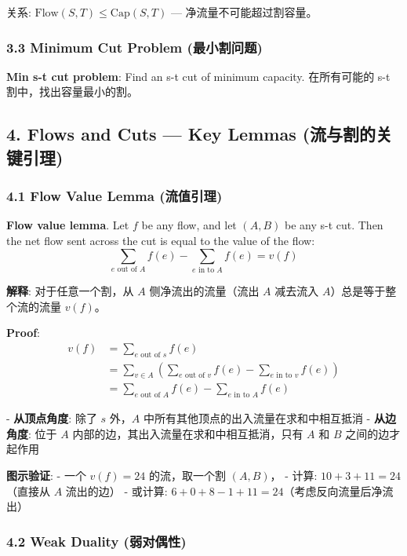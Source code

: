 \documentclass[10pt,a4paper,openany]{ctexbook}
\theoremstyle{definition}
\theoremstyle{remark}
\renewenvironment{quote}
  {\list{}{\leftmargin=1em\rightmargin=0pt\topsep=0.5pt\partopsep=0pt}\item[]}
  {\endlist}
\begin{document}
关系: $\text{Flow}(S,T) \le \text{Cap}(S,T)$ — 净流量不可能超过割容量。
\subsubsection{3.3 Minimum Cut Problem (最小割问题)}

\textbf{Min s-t cut problem}: Find an s-t cut of minimum capacity.
在所有可能的 s-t 割中，找出容量最小的割。
\vspace{-2pt}

\subsection{4. Flows and Cuts — Key Lemmas (流与割的关键引理)}

\subsubsection{4.1 Flow Value Lemma (流值引理)}

\textbf{Flow value lemma}. Let $f$ be any flow, and let $(A, B)$ be any s-t cut. Then the net flow sent across the cut is equal to the value of the flow:
\[
\sum_{e \text{ out of } A} f(e) - \sum_{e \text{ in to } A} f(e) = v(f)
\]

\begin{quote}
\textbf{解释}: 对于任意一个割，从 $A$ 侧净流出的流量（流出 $A$ 减去流入 $A$）总是等于整个流的流量 $v(f)$。

\textbf{Proof}:
\[
\begin{aligned}
v(f) &= \sum_{e \text{ out of } s} f(e) \\
&= \sum_{v \in A} \left( \sum_{e \text{ out of } v} f(e) - \sum_{e \text{ in to } v} f(e) \right) \\
&= \sum_{e \text{ out of } A} f(e) - \sum_{e \text{ in to } A} f(e)
\end{aligned}
\]


- \textbf{从顶点角度}: 除了 $s$ 外，$A$ 中所有其他顶点的出入流量在求和中相互抵消
- \textbf{从边角度}: 位于 $A$ 内部的边，其出入流量在求和中相互抵消，只有 $A$ 和 $B$ 之间的边才起作用

\textbf{图示验证}:
- 一个 $v(f)=24$ 的流，取一个割 $(A,B)$，
- 计算: $10 + 3 + 11 = 24$（直接从 $A$ 流出的边）
- 或计算: $6 + 0 + 8 - 1 + 11 = 24$（考虑反向流量后净流出）

\end{quote}

\subsubsection{4.2 Weak Duality (弱对偶性)}
\end{document}
